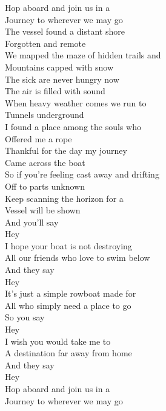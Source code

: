 \documentclass[12pt]{ctexart}
\begin{document}
\begin{paracol}{2}
\begin{leftcolumn*}
			Hop aboard and join us in a\\
			Journey to wherever we may go\\
			The vessel found a distant shore\\
			Forgotten and remote\\
			We mapped the maze of hidden trails and\\
			Mountains capped with snow\\
			The sick are never hungry now\\
			The air is filled with sound\\
			When heavy weather comes we run to\\
			Tunnels underground\\
			I found a place among the souls who\\
			Offered me a rope\\
			Thankful for the day my journey\\
			Came across the boat\\
			So if you're feeling cast away and drifting\\
			Off to parts unknown\\
			Keep scanning the horizon for a\\
			Vessel will be shown\\
			And you'll say\\
			Hey\\
			
			I hope your boat is not destroying\\
			All our friends who love to swim below\\
			And they say\\
			Hey\\
			
			It's just a simple rowboat made for\\
			All who simply need a place to go\\
			So you say\\
			Hey\\
			
			I wish you would take me to\\
			A destination far away from home\\
			And they say\\
			Hey\\
			
			Hop aboard and join us in a\\
			Journey to wherever we may go\\
			
		\end{leftcolumn*}
		

\end{paracol}
\end{document}

